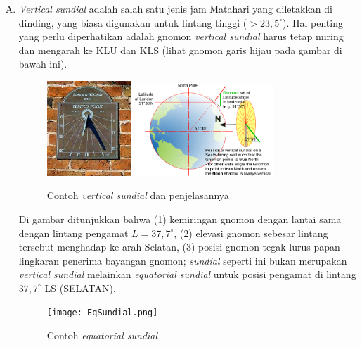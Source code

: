 \documentclass[11pt,fleqn]{exam}
\begin{document}
\begin{questions}
\begin{enumerate}[A.]
\item \textit{Vertical sundial} adalah salah satu jenis jam Matahari yang diletakkan di dinding, yang biasa digunakan untuk lintang tinggi ($> 23,5^{\circ}$). Hal penting yang perlu diperhatikan adalah gnomon \textit{vertical sundial}  harus tetap miring dan mengarah ke KLU dan KLS (lihat gnomon garis hijau pada gambar di bawah ini). 
\begin{figure}[H]
\centering
\includegraphics[width=0.3\textwidth]{VerticalSundial1.png}
\includegraphics[width=0.49\textwidth]{VerticalSundial.png}
\captionsetup{labelformat=empty}
\caption{Contoh \textit{vertical sundial} dan penjelasannya}
\label{fig:osp2022_27_jawab}
\end{figure}

Di gambar ditunjukkan bahwa (1) kemiringan gnomon dengan lantai sama dengan lintang pengamat $L = 37,7^{\circ}$, (2) elevasi gnomon sebesar lintang tersebut menghadap ke arah Selatan, (3) posisi gnomon tegak lurus papan lingkaran penerima bayangan gnomon; \textit{sundial} seperti ini bukan merupakan \textit{vertical sundial} melainkan \textit{equatorial sundial} untuk posisi pengamat di lintang $37,7^{\circ}$ LS (SELATAN).
\begin{figure}[H]
\centering
\texttt{[image: EqSundial.png]}
\captionsetup{labelformat=empty}
\caption{Contoh \textit{equatorial sundial}}
\label{fig:osp2022_27_jawab2}
\end{figure}


\end{enumerate}
\end{questions}
\end{document}
